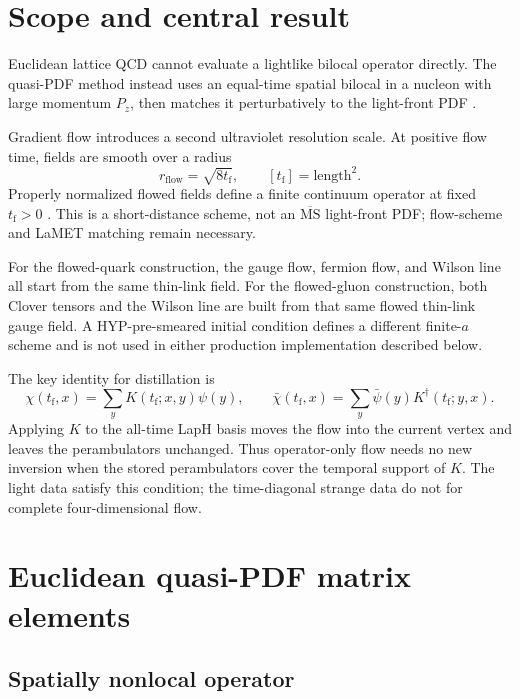 \documentclass[11pt]{article}
\numberwithin{equation}{section}
\newcommand{\MSbar}{\overline{\mathrm{MS}}}
\newcommand{\rflow}{r_{\mathrm{flow}}}
\newcommand{\tf}{t_{\mathrm f}}
\begin{document}
\tableofcontents

\section{Scope and central result}

Euclidean lattice QCD cannot evaluate a lightlike bilocal operator directly.
The quasi-PDF method instead uses an equal-time spatial bilocal in a nucleon
with large momentum \(P_z\), then matches it perturbatively to the light-front
PDF \cite{Ji2013}.

Gradient flow introduces a second ultraviolet resolution scale. At positive
flow time, fields are smooth over a radius
\begin{equation}
  \rflow=\sqrt{8\tf},
  \qquad [\tf]=\text{length}^2.
\end{equation}
Properly normalized flowed fields define a finite continuum operator at fixed
\(\tf>0\) \cite{Luscher2010,Luscher2013,MonahanOrginos2017}. This is a
short-distance scheme, not an \(\MSbar\) light-front PDF; flow-scheme and LaMET
matching remain necessary.

For the flowed-quark construction, the gauge flow, fermion flow, and Wilson
line all start from the same thin-link field.  For the flowed-gluon
construction, both Clover tensors and the Wilson line are built from that same
flowed thin-link gauge field.  A HYP-pre-smeared initial condition defines a
different finite-\(a\) scheme and is not used in either production
implementation described below.

The key identity for distillation is
\begin{equation}
  \chi(\tf,x)=\sum_y K(\tf;x,y)\psi(y),
  \qquad
  \bar\chi(\tf,x)=\sum_y\bar\psi(y)K^\dagger(\tf;y,x).
  \label{eq:kernel-solution-summary}
\end{equation}
Applying \(K\) to the all-time LapH basis moves the flow into the current
vertex and leaves the perambulators unchanged. Thus operator-only flow needs
no new inversion when the stored perambulators cover the temporal support of
\(K\). The light data satisfy this condition; the time-diagonal strange data
do not for complete four-dimensional flow.

\section{Euclidean quasi-PDF matrix elements}

\subsection{Spatially nonlocal operator}
\end{document}
